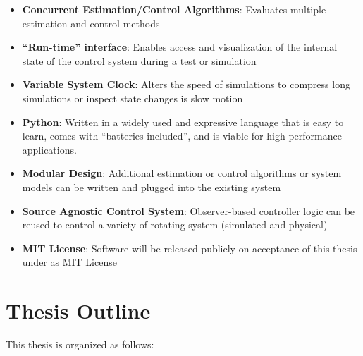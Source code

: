 \begin{itemize}
  \item \textbf{Concurrent Estimation/Control Algorithms}: Evaluates  multiple estimation and control methods
  \item \textbf{``Run-time'' interface}: Enables access and visualization of the internal state of the control system during a test or simulation
  \item \textbf{Variable System Clock}: Alters the speed of simulations to compress long simulations or inspect state changes is slow motion
  \item \textbf{Python}: Written in a widely used and expressive language that is easy to learn, comes with ``batteries-included'', and is viable for high performance applications.
  \item \textbf{Modular Design}: Additional estimation or control algorithms or system models can be written and plugged into the existing system
  \item \textbf{Source Agnostic Control System}: Observer-based controller logic can be reused to control a variety of rotating system (simulated and physical)
  \item \textbf{MIT License}: Software will be released publicly on acceptance of this thesis under as MIT License
\end{itemize}

\section{Thesis Outline}
\label{sec:ThesisOutline}

This thesis is organized as follows:

